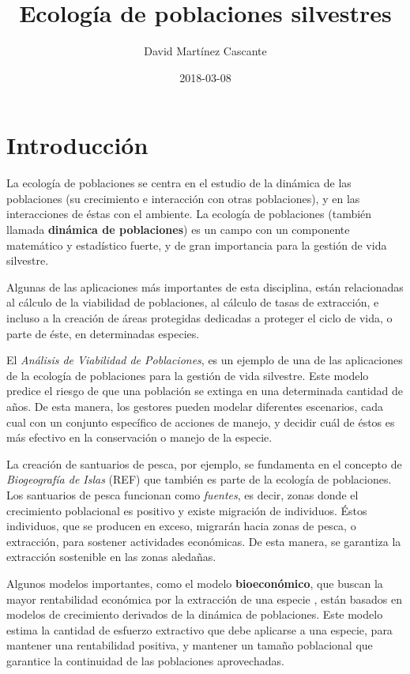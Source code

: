 \documentclass[12pt,letterpaper,]{book}
\title{Ecología de poblaciones silvestres}
\author{David Martínez Cascante}
\date{2018-03-08}
\begin{document}
\maketitle

{
\hypersetup{linkcolor=black}
\setcounter{tocdepth}{1}
\tableofcontents
}
\chapter{Introducción}\label{intro}

La ecología de poblaciones se centra en
el estudio de la dinámica de las
poblaciones (su crecimiento e
interacción con otras poblaciones), y en las interacciones de éstas con
el ambiente. La ecología de poblaciones (también llamada
\textbf{dinámica de poblaciones}) es un campo con un componente
matemático y estadístico fuerte, y de gran importancia para la gestión
de vida silvestre.

Algunas de las aplicaciones más importantes de esta disciplina, están
relacionadas al cálculo de la viabilidad de poblaciones, al cálculo de
tasas de extracción, e incluso a la creación de áreas protegidas
dedicadas a proteger el ciclo de vida, o parte de éste, en determinadas
especies.

El \emph{Análisis de Viabilidad de Poblaciones}, es un ejemplo de una de
las aplicaciones de la ecología de poblaciones para la gestión de vida
silvestre. Este modelo predice el riesgo de que una población se extinga
en una determinada cantidad de años. De esta manera, los gestores pueden
modelar diferentes escenarios, cada cual con un conjunto específico de
acciones de manejo, y decidir cuál de éstos es más efectivo en la
conservación o manejo de la especie.

La creación de santuarios de pesca, por ejemplo, se fundamenta en el
concepto de \emph{Biogeografía de Islas} (REF) que también es parte de
la ecología de poblaciones. Los santuarios de pesca funcionan como
\emph{fuentes}, es decir, zonas donde el crecimiento poblacional es
positivo y existe migración de individuos. Éstos individuos, que se
producen en exceso, migrarán hacia zonas de pesca, o extracción, para
sostener actividades económicas. De esta manera, se garantiza la
extracción sostenible en las zonas aledañas.

Algunos modelos importantes, como el modelo \textbf{bioeconómico}, que
buscan la mayor rentabilidad económica por la extracción de una especie
\citep{Grafton2006}, están basados en modelos de crecimiento derivados
de la dinámica de poblaciones. Este modelo estima la cantidad de
esfuerzo extractivo que debe aplicarse a una especie, para mantener una
rentabilidad positiva, y mantener un tamaño poblacional que garantice la
continuidad de las poblaciones aprovechadas.
\end{document}
